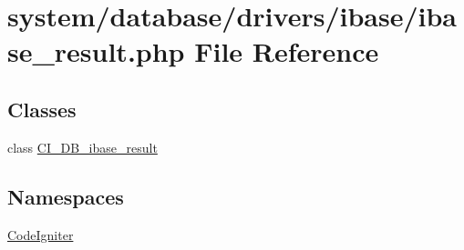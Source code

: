 \hypertarget{ibase__result_8php}{}\section{system/database/drivers/ibase/ibase\+\_\+result.php File Reference}
\label{ibase__result_8php}
\subsection*{Classes}
\begin{DoxyCompactItemize}
\item 
class \mbox{\hyperlink{class_c_i___d_b__ibase__result}{C\+I\+\_\+\+D\+B\+\_\+ibase\+\_\+result}}
\end{DoxyCompactItemize}
\subsection*{Namespaces}
\begin{DoxyCompactItemize}
\item 
 \mbox{\hyperlink{namespace_code_igniter}{Code\+Igniter}}
\end{DoxyCompactItemize}
